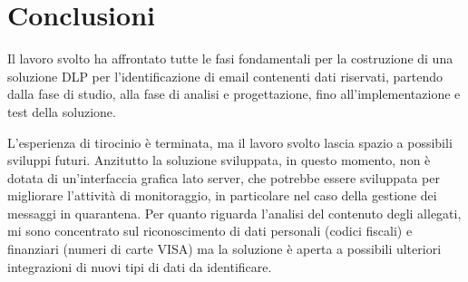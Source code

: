 \chapter{Conclusioni}

Il lavoro svolto ha affrontato tutte le fasi fondamentali per la costruzione di una 
soluzione DLP per l'identificazione di email contenenti dati riservati, partendo dalla fase di 
studio, alla fase di analisi e progettazione, fino all'implementazione e test della soluzione.

L'esperienza di tirocinio è terminata, ma il lavoro svolto lascia spazio a possibili sviluppi futuri.
Anzitutto la soluzione sviluppata, in questo momento, non è dotata di un'interfaccia grafica lato server,
che potrebbe essere sviluppata per migliorare l'attività di monitoraggio, in particolare nel caso della 
gestione dei messaggi in quarantena.
Per quanto riguarda l'analisi del contenuto degli allegati, mi sono concentrato sul riconoscimento di dati personali 
(codici fiscali) e finanziari (numeri di carte VISA) ma la soluzione è aperta a possibili ulteriori integrazioni di nuovi
tipi di dati da identificare. 
